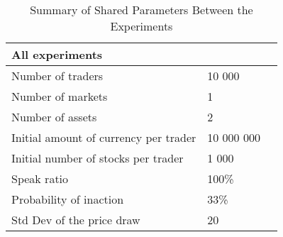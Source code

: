 \begin{table}[H]
    \centering
    
    \caption{Summary of Shared Parameters Between the Experiments}
    \label{tbl:parameter_summary}

    \begin{adjustbox}{width=1\textwidth}
    \begin{tabular}{llp{6cm}}
        \toprule
        \textbf{All experiments              } & &             \\
        \midrule
        Number of traders                      &      10 000 & \\
        Number of markets                      &           1 & \\
        Number of assets                       &           2 & \\
        \midrule
        Initial amount of currency per trader  &  10 000 000 & \\
        Initial number of stocks per trader    &       1 000 & \\
        \midrule
        Speak ratio                            &       100\% & \\
        Probability of inaction                &        33\% & \\
        Std Dev of the price draw              &          20 & \\
        \bottomrule
    \end{tabular}

\end{adjustbox}
\end{table} 